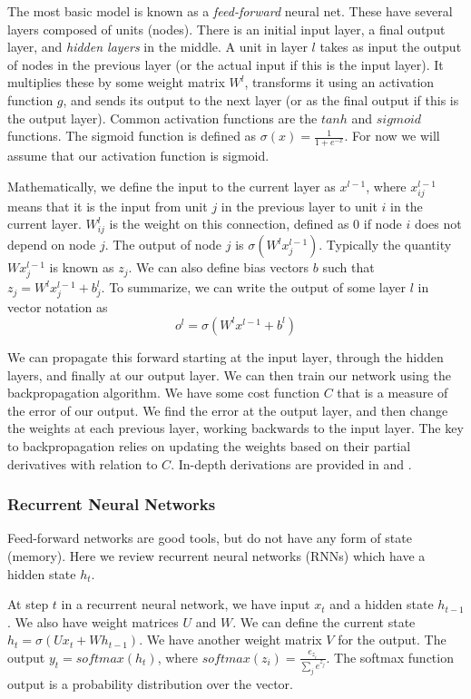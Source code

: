\documentclass[pageno]{jpaper}
\begin{document}
The most basic model is known as a \textit{feed-forward} neural net. These have
several layers composed of units (nodes). There is an initial input layer, a
final output layer, and \textit{hidden layers} in the middle. A unit in layer
$l$ takes as input the output of nodes in the previous layer (or the actual
input if this is the input layer). It multiplies these by some weight matrix
$W^l$, transforms it using an activation function $g$, and sends its output to the
next layer (or as the final output if this is the output layer). Common
activation functions are the $tanh$ and $sigmoid$ functions. The sigmoid
function is defined as $\sigma (x) = \frac{1}{1+e^{-x}}$. For now we will assume
that our activation function is sigmoid.

Mathematically, we define the input to the current layer as $x^{l-1}$,
where $x^{l-1}_{ij}$ means that it is the input from unit $j$ in the previous
layer to unit $i$ in the current layer. $W^l_{ij}$ is the weight on this
connection, defined as 0 if node $i$ does not depend on node $j$. The output of
node $j$ is $\sigma ( W^l x^{l-1}_j)$. Typically the quantity $Wx^{l-1}_j$ is
known as $z_j$. We can also define bias vectors $b$ such that $z_j =
W^lx^{l-1}_j + b^l_j$. To summarize, we can write the output of some layer $l$
in vector notation as
$$o^l = \sigma(W^lx^{l-1} + b^l)$$

We can propagate this forward starting at the input layer, through the hidden
layers, and finally at our output layer. We can then train our network using the
backpropagation algorithm. We have some cost function $C$ that is a measure of
the error of our output. We find the error at the output layer, and then change
the weights at each previous layer, working backwards to the input layer. The
key to backpropagation relies on updating the weights based on their partial
derivatives with relation to $C$. In-depth derivations are provided in
\cite{Bishop1995} and \cite{Nielsen2015}.\\

\subsubsection{Recurrent Neural Networks}
\label{Recurrent Neural Networks}

Feed-forward networks are good tools, but do not have any form of state
(memory). Here we review recurrent neural networks (RNNs) which have a hidden
state $h_t$.

At step $t$ in a recurrent neural network, we have input $x_t$ and a hidden
state $h_{t-1}$. We also have weight matrices $U$ and $W$. We can define the
current state $h_t = \sigma(Ux_t + Wh_{t-1})$. We have another weight matrix $V$
for the output. The output $y_t = softmax(h_t)$, where $softmax(z_i) =
\frac{e_{z_i}}{\sum_j e^{z_j}}$. The softmax function output is a probability
distribution over the vector.
\end{document}
